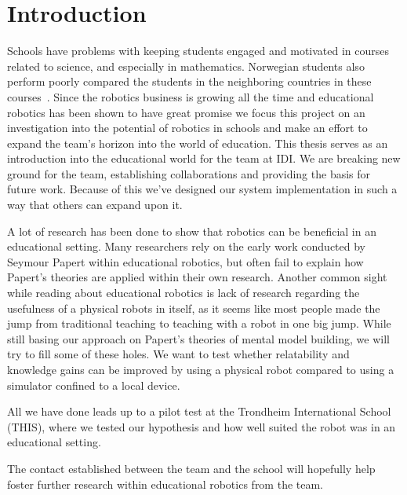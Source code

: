 \chapter{Introduction}
Schools have problems with keeping students engaged and motivated in courses related to science, and especially in mathematics. 
Norwegian students also perform poorly compared the students in the neighboring countries in these courses~\cite{OECDPISA}.
Since the robotics business is growing all the time and educational robotics has been shown to have great promise we focus this project on an investigation into the potential of robotics in schools and make an effort to expand the \chirp team's horizon into the world of education. This thesis serves as an introduction into the educational world for the \chirp team at IDI. We are breaking new ground for the team, establishing collaborations and providing the basis for future work. 
Because of this we've designed our system implementation in such a way that others can expand upon it. 

\bigskip\noindent
A lot of research has been done to show that robotics can be beneficial in an educational setting.
Many researchers rely on the early work conducted by Seymour Papert within educational robotics, but often fail to explain how Papert's theories are applied within their own research. 
Another common sight while reading about educational robotics is lack of research regarding the usefulness of a physical robots in itself, as it seems like most people made the jump from traditional teaching to teaching with a robot in one big jump. 
While still basing our approach on Papert's theories of mental model building, we will try to fill some of these holes. We want to test whether relatability and knowledge gains can be improved by using a physical robot compared to using a simulator confined to a local device. 

\bigskip\noindent


\bigskip\noindent
All we have done leads up to a pilot test at the Trondheim International School (THIS), where we tested our hypothesis and how well suited the \chirp robot was in an educational setting. 

\bigskip\noindent
The contact established between the \chirp team and the school will hopefully help foster further research within educational robotics from the \chirp team.





